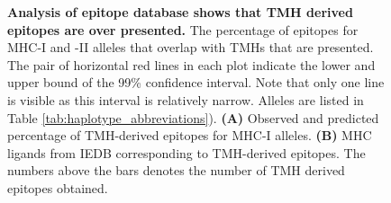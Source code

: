 \begin{figure}[!htbp]
  \caption{
    \textbf{
      Analysis of epitope database shows that TMH derived epitopes are over presented.
    }
    The percentage of epitopes for MHC-I and -II alleles that overlap with TMHs
    that are presented. The pair of horizontal red lines in each plot indicate the
    lower and upper bound of the 99\% confidence interval. Note that only one line
    is visible as this interval is relatively narrow. 
    Alleles are listed in Table \ref{tab:haplotype_abbreviations}).
    \textbf{(A)} 
    Observed and predicted percentage of TMH-derived epitopes for MHC-I alleles. 
    \textbf{(B)} 
    MHC ligands from IEDB corresponding to TMH-derived epitopes. 
    The numbers above the bars denotes the number of TMH derived epitopes obtained.
  }
  \label{fig:elution}
\end{figure}

\clearpage

\thispagestyle{empty}


